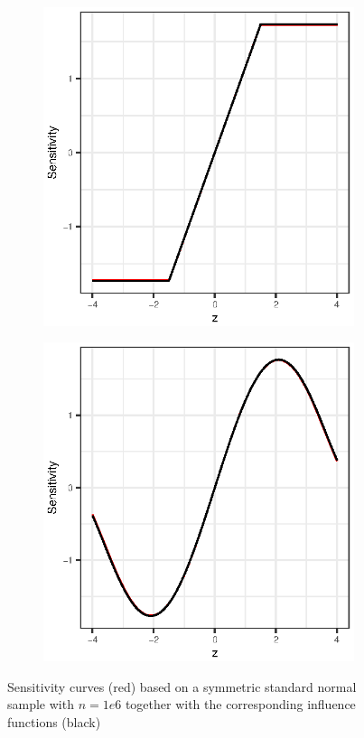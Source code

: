 \documentclass[titlepage]{article}
\begin{document}
\begin{figure}[!htb]
  \begin{subfigure}{0.5\linewidth}
    \centering
    \includegraphics{q1-sens_curves_huber_large}
  \end{subfigure}
  \begin{subfigure}{0.5\linewidth}
    \centering
    \includegraphics{q1-sens_curves_tukey_large}
  \end{subfigure}
  \caption{Sensitivity curves (red) based on a symmetric standard normal sample with $n = 1e6$ together with the corresponding influence functions (black)}
  \label{fig:q1-sens-curves-1e2}
\end{figure}
\end{document}
